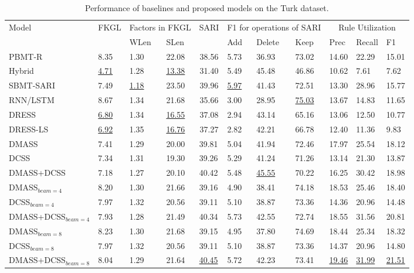 \documentclass[11pt,a4paper]{article}
\begin{document}
\begin{table*}[!h]
\fontsize{8}{8}\selectfont
\centering
\renewcommand{\arraystretch}{1.3}
\begin{tabular}{|l|l|ll|l|lll|lll|}
\hline
\multirow{2}{*}{Model} & \multicolumn{1}{c|}{\multirow{2}{*}{FKGL}} & \multicolumn{2}{c|}{Factors in FKGL} & \multicolumn{1}{c|}{\multirow{2}{*}{SARI}} & \multicolumn{3}{c|}{F1 for operations of SARI} & \multicolumn{3}{c|}{Rule Utilization} \\ \cline{3-4} \cline{6-11} 
 & \multicolumn{1}{c|}{} & \multicolumn{1}{l|}{WLen} & SLen & \multicolumn{1}{c|}{} & \multicolumn{1}{l|}{Add} & \multicolumn{1}{l|}{Delete} & Keep & \multicolumn{1}{l|}{Prec} & \multicolumn{1}{l|}{Recall} & F1 \\ \hline
PBMT-R & 8.35 & 1.30 & 22.08 & \multicolumn{1}{c|}{38.56} & 5.73 & 36.93 & 73.02 & 14.60 & 22.29 & 15.01 \\
Hybrid & \underline{4.71} & 1.28 & \underline{13.38} & \multicolumn{1}{c|}{31.40} & 5.49 & 45.48 & 46.86 & 10.62 & 7.61 & 7.62 \\
SBMT-SARI & 7.49 & \underline{1.18} & 23.50 & \multicolumn{1}{c|}{39.96} & \underline{5.97} & 41.43 & 72.51 & 13.30 & 28.96 & 15.77 \\
RNN/LSTM & 8.67 & 1.34 & 21.68 & \multicolumn{1}{c|}{35.66} & 3.00 & 28.95 & \underline{75.03} & 13.67 & 14.83 & 11.65 \\
DRESS & \underline{6.80} & 1.34 & \underline{16.55} & \multicolumn{1}{c|}{37.08} & 2.94 & 43.14 & 65.16 & 13.06 & 12.50 & 10.77 \\
DRESS-LS & \underline{6.92} & 1.35 & \underline{16.76} & \multicolumn{1}{c|}{37.27} & 2.82 & 42.21 & 66.78 & 12.40 & 11.36 & 9.83 \\ \hline
DMASS & 7.41 & 1.29 & 20.00 & 39.81 & 5.04 & 41.94 & 72.46 & 17.97 & 25.54 & 18.12 \\
DCSS & 7.34 & 1.31 & 19.30 & 39.26 & 5.29 & 41.24 & 71.26 & 13.14 & 21.30 & 13.87 \\
DMASS+DCSS & 7.18 & 1.27 & 20.10 & 40.42 & 5.48 & \underline{45.55} & 70.22 & 16.25 & 30.42 & 18.98 \\ \hline
DMASS$_{beam=4}$ & 8.20 & 1.30 & 21.66 & 39.16 & 4.90 & 38.41 & 74.18 & 18.53 & 25.46 & 18.40 \\
DCSS$_{beam=4}$ & 7.97 & 1.32 & 20.56 & 39.11 & 5.10 & 38.87 & 73.36 & 14.36 & 20.96 & 14.48 \\
DMASS+DCSS$_{beam=4}$ & 7.93 & 1.28 & 21.49 & 40.34 & 5.73 & 42.55 & 72.74 & 18.55 & 31.56 & 20.81 \\ \hline
DMASS$_{beam=8}$ & 8.23 & 1.30 & 21.68 & 39.15 & 4.95 & 37.80 & 74.69 & 18.44 & 25.34 & 18.32 \\
DCSS$_{beam=8}$ & 7.97 & 1.32 & 20.56 & 39.11 & 5.10 & 38.87 & 73.36 & 14.37 & 20.96 & 14.80 \\
DMASS+DCSS$_{beam=8}$ & 8.04 & 1.29 & 21.64 & \underline{40.45} & 5.72 & 42.23 & 73.41 & \underline{19.46} & \underline{31.99} & \underline{21.51} \\ \hline
\end{tabular}
\caption{Performance of baselines and proposed models on the Turk dataset.}
\label{tab:perf_all}
\end{table*}
\end{document}
